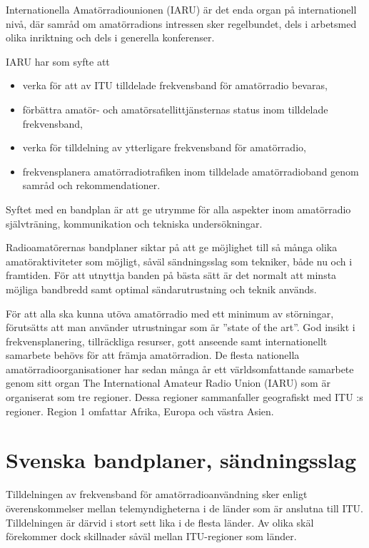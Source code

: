 Internationella Amatörradiounionen (IARU) är det enda organ på internationell
nivå, där samråd om amatörradions intressen sker regelbundet, dels i arbetsmed
olika inriktning och dels i generella konferenser.

IARU har som syfte att

\begin{itemize}
\item verka för att av ITU tilldelade frekvensband för amatörradio bevaras,
\item förbättra amatör- och amatörsatellittjänsternas status inom tilldelade
  frekvensband,
\item verka för tilldelning av ytterligare frekvensband för amatörradio,
\item frekvensplanera amatörradiotrafiken inom tilldelade amatörradioband genom
  samråd och rekommendationer.
\end{itemize}

Syftet med en bandplan är att ge utrymme för alla aspekter inom amatörradio
självträning, kommunikation och tekniska undersökningar.

Radioamatörernas bandplaner siktar på att ge möjlighet till så många olika
amatöraktiviteter som möjligt, såväl sändningsslag som tekniker, både nu och i
framtiden. För att utnyttja banden på bästa sätt är det normalt att minsta
möjliga bandbredd samt optimal sändarutrustning och teknik används.

För att alla ska kunna utöva amatörradio med ett minimum av störningar,
förutsätts att man använder utrustningar som är ''state of the art''.  God
insikt i frekvensplanering, tillräckliga resurser, gott anseende samt
internationellt samarbete behövs för att främja amatörradion. De flesta
nationella amatörradioorganisationer har sedan många år ett världsomfattande
samarbete genom sitt organ The International Amateur Radio Union (IARU) som är
organiserat som tre regioner. Dessa regioner sammanfaller geografiskt med ITU :s
regioner. Region 1 omfattar Afrika, Europa och västra Asien.

\section{Svenska bandplaner, sändningsslag}

Tilldelningen av frekvensband för amatörradioanvändning sker enligt
överenskommelser mellan telemyndigheterna i de länder som är anslutna till
ITU. Tilldelningen är därvid i stort sett lika i de flesta länder. Av olika skäl
förekommer dock skillnader såväl mellan ITU-regioner som länder.


